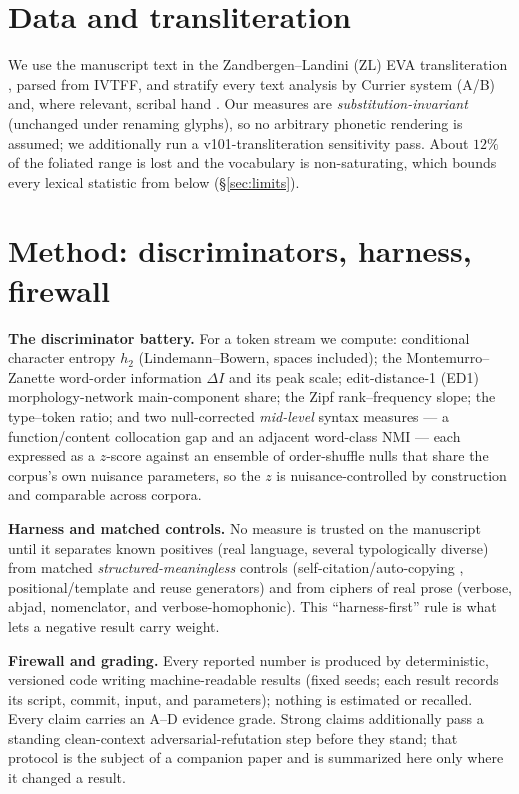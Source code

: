 \documentclass[11pt]{article}
\begin{document}
\section{Data and transliteration}
We use the manuscript text in the Zandbergen--Landini (ZL) EVA transliteration
\citep{zandbergen_voynichnu}, parsed from IVTFF, and stratify every text analysis by Currier
system (A/B) and, where relevant, scribal hand \citep{fagindavis2020hands}. Our measures are
\emph{substitution-invariant} (unchanged under renaming glyphs), so no arbitrary phonetic
rendering is assumed; we additionally run a v101-transliteration sensitivity pass. About
$12\%$ of the foliated range is lost and the vocabulary is non-saturating, which bounds every
lexical statistic from below (\S\ref{sec:limits}).

\section{Method: discriminators, harness, firewall}
\label{sec:method}
\textbf{The discriminator battery.} For a token stream we compute: conditional character
entropy $h_2$ (Lindemann--Bowern, spaces included); the Montemurro--Zanette word-order
information $\Delta I$ and its peak scale; edit-distance-1 (ED1) morphology-network main-component
share; the Zipf rank--frequency slope; the type--token ratio; and two null-corrected
\emph{mid-level} syntax measures --- a function/content collocation gap and an adjacent
word-class NMI \citep{brown1992class} --- each expressed as a $z$-score against an ensemble of
order-shuffle nulls that share the corpus's own nuisance parameters, so the $z$ is
nuisance-controlled by construction and comparable across corpora.

\textbf{Harness and matched controls.} No measure is trusted on the manuscript until it
separates known positives (real language, several typologically diverse) from matched
\emph{structured-meaningless} controls (self-citation/auto-copying \citep{timm2020selfcitation},
positional/template and reuse generators) and from ciphers of real prose (verbose, abjad,
nomenclator, and verbose-homophonic). This ``harness-first'' rule is what lets a negative
result carry weight.

\textbf{Firewall and grading.} Every reported number is produced by deterministic, versioned
code writing machine-readable results (fixed seeds; each result records its script, commit,
input, and parameters); nothing is estimated or recalled. Every claim carries an A--D evidence
grade. Strong claims additionally pass a standing clean-context adversarial-refutation step
before they stand; that protocol is the subject of a companion paper and is summarized here only
where it changed a result.
\end{document}
